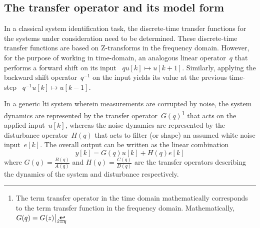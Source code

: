
\vspace*{-2mm}
\subsection{The transfer operator and its model form}
In a classical system identification  task, the discrete-time transfer functions
for the systems  under consideration need to be  determined. These discrete-time
transfer functions are  based on Z-transforms in the  frequency domain. However,
for the purpose of working in time-domain, an analogous linear operator~$q$ that
performs a  forward shift on  its input \ie~$  {q u[k] \longmapsto  u[k+1]} $.
Similarly, applying the  backward shift operator~$ q^{-1} $  on the input yields
its value at the previous time-step \ie~$ {q^{-1} u[k] \longmapsto u[k-1]}$.


In a generic  \gls{lti} system wherein measurements are corrupted  by noise, the
system  dynamics are  represented by  the transfer  operator~$G(q)$\footnote{The
term  transfer operator  in the  time domain  mathematically corresponds  to the
term  transfer  function  in  the  frequency  domain.  Mathematically,~${G(q)  =
G(z)\bigr\rvert_{\mathrlap{z=q}}}$.}  that  acts  on the  applied  input~$u[k]$,
whereas the  noise dynamics are  represented by the  disturbance operator~$H(q)$
that acts to filter (or shape) an assumed white noise input~$e[k]$. The overall output can be written as the linear combination
\begin{equation}\label{eq:outputwithsysandnoise}
    y[k] = G(q)u[k] + H(q)e[k]
\end{equation}
where ${G(q) = \frac{B(q)}{A(q)}}$ and ${H(q) = \frac{C(q)}{D(q)}}$ are the transfer
operators describing the dynamics of the system and disturbance respectively.

